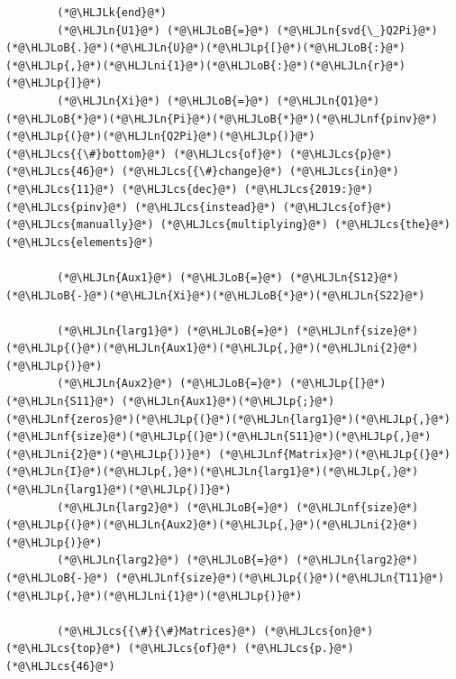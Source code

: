 \documentclass[12pt,a4paper]{article}
\newcommand{\HLJLk}[1]{\textcolor[RGB]{148,91,176}{\textbf{#1}}}
\newcommand{\HLJLn}[1]{#1}
\newcommand{\HLJLnf}[1]{\textcolor[RGB]{66,102,213}{#1}}
\newcommand{\HLJLni}[1]{\textcolor[RGB]{59,151,46}{#1}}
\newcommand{\HLJLoB}[1]{\textcolor[RGB]{102,102,102}{\textbf{#1}}}
\newcommand{\HLJLp}[1]{#1}
\newcommand{\HLJLcs}[1]{\textcolor[RGB]{153,153,119}{\textit{#1}}}
\begin{document}
\begin{lstlisting}
        (*@\HLJLk{end}@*)
        (*@\HLJLn{U1}@*) (*@\HLJLoB{=}@*) (*@\HLJLn{svd{\_}Q2Pi}@*)(*@\HLJLoB{.}@*)(*@\HLJLn{U}@*)(*@\HLJLp{[}@*)(*@\HLJLoB{:}@*)(*@\HLJLp{,}@*)(*@\HLJLni{1}@*)(*@\HLJLoB{:}@*)(*@\HLJLn{r}@*)(*@\HLJLp{]}@*)
        (*@\HLJLn{Xi}@*) (*@\HLJLoB{=}@*) (*@\HLJLn{Q1}@*)(*@\HLJLoB{*}@*)(*@\HLJLn{Pi}@*)(*@\HLJLoB{*}@*)(*@\HLJLnf{pinv}@*)(*@\HLJLp{(}@*)(*@\HLJLn{Q2Pi}@*)(*@\HLJLp{)}@*) (*@\HLJLcs{{\#}bottom}@*) (*@\HLJLcs{of}@*) (*@\HLJLcs{p}@*) (*@\HLJLcs{46}@*) (*@\HLJLcs{{\#}change}@*) (*@\HLJLcs{in}@*) (*@\HLJLcs{11}@*) (*@\HLJLcs{dec}@*) (*@\HLJLcs{2019:}@*) (*@\HLJLcs{pinv}@*) (*@\HLJLcs{instead}@*) (*@\HLJLcs{of}@*) (*@\HLJLcs{manually}@*) (*@\HLJLcs{multiplying}@*) (*@\HLJLcs{the}@*) (*@\HLJLcs{elements}@*)

        (*@\HLJLn{Aux1}@*) (*@\HLJLoB{=}@*) (*@\HLJLn{S12}@*)(*@\HLJLoB{-}@*)(*@\HLJLn{Xi}@*)(*@\HLJLoB{*}@*)(*@\HLJLn{S22}@*)

        (*@\HLJLn{larg1}@*) (*@\HLJLoB{=}@*) (*@\HLJLnf{size}@*)(*@\HLJLp{(}@*)(*@\HLJLn{Aux1}@*)(*@\HLJLp{,}@*)(*@\HLJLni{2}@*)(*@\HLJLp{)}@*)
        (*@\HLJLn{Aux2}@*) (*@\HLJLoB{=}@*) (*@\HLJLp{[}@*)(*@\HLJLn{S11}@*) (*@\HLJLn{Aux1}@*)(*@\HLJLp{;}@*)(*@\HLJLnf{zeros}@*)(*@\HLJLp{(}@*)(*@\HLJLn{larg1}@*)(*@\HLJLp{,}@*)(*@\HLJLnf{size}@*)(*@\HLJLp{(}@*)(*@\HLJLn{S11}@*)(*@\HLJLp{,}@*)(*@\HLJLni{2}@*)(*@\HLJLp{))}@*) (*@\HLJLnf{Matrix}@*)(*@\HLJLp{(}@*)(*@\HLJLn{I}@*)(*@\HLJLp{,}@*)(*@\HLJLn{larg1}@*)(*@\HLJLp{,}@*)(*@\HLJLn{larg1}@*)(*@\HLJLp{)]}@*)
        (*@\HLJLn{larg2}@*) (*@\HLJLoB{=}@*) (*@\HLJLnf{size}@*)(*@\HLJLp{(}@*)(*@\HLJLn{Aux2}@*)(*@\HLJLp{,}@*)(*@\HLJLni{2}@*)(*@\HLJLp{)}@*)
        (*@\HLJLn{larg2}@*) (*@\HLJLoB{=}@*) (*@\HLJLn{larg2}@*) (*@\HLJLoB{-}@*) (*@\HLJLnf{size}@*)(*@\HLJLp{(}@*)(*@\HLJLn{T11}@*)(*@\HLJLp{,}@*)(*@\HLJLni{1}@*)(*@\HLJLp{)}@*)

        (*@\HLJLcs{{\#}{\#}Matrices}@*) (*@\HLJLcs{on}@*) (*@\HLJLcs{top}@*) (*@\HLJLcs{of}@*) (*@\HLJLcs{p.}@*) (*@\HLJLcs{46}@*)


\end{lstlisting}
\end{document}
